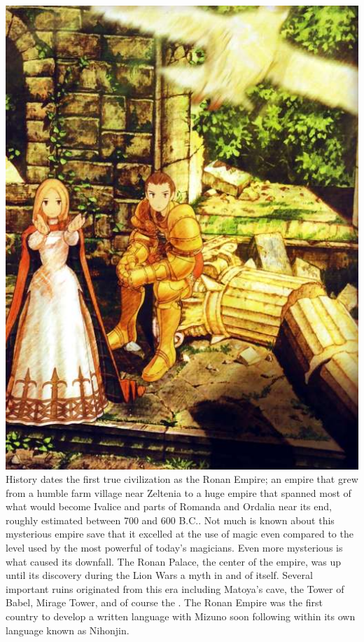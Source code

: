 \includegraphics[width=\columnwidth]{./art/worldbook/ovelia.jpg}
\ofpar
%
\\
History dates the first true civilization as the Ronan Empire; an empire that grew from a humble farm village near Zeltenia to a huge empire that spanned most of what would become Ivalice and parts of Romanda and Ordalia near its end, roughly estimated between 700 and 600 B.C.. 
Not much is known about this mysterious empire save that it excelled at the use of magic even compared to the level used by the most powerful of today's magicians. 
Even more mysterious is what caused its downfall. 
The Ronan Palace, the center of the empire, was up until its discovery during the Lion Wars a myth in and of itself. 
Several important ruins originated from this era including Matoya's cave, the Tower of Babel, Mirage Tower, and of course the . 
The Ronan Empire was the first country to develop a written language with Mizuno soon following within its own language known as Nihonjin.
